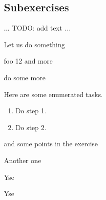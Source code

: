\documentclass[
  twocolumn,%
  fontsize=9pt,%
  DIV=calc,%
  numbers=noendperiod%
]{scrartcl}
\begin{document}
\subsection{Subexercises}
... TODO: add text ...

\begin{exercise}
  Let us do something
  \begin{subexercise}
    foo 12 
    and more 
  \end{subexercise}

  \begin{subexercise}
    do some more
  \end{subexercise}

  \begin{subexercise}
    Here are some enumerated tasks.
    \begin{enumerate}
      \item Do step 1.
      \item Do step 2. 
    \end{enumerate}
  \end{subexercise}

  and some points in the exercise 
\end{exercise}

\begin{exercise}
  Another one
  \begin{subexercise}
    Yse 
  \end{subexercise}
  \begin{subexercise}
    Yse 
  \end{subexercise}
\end{exercise}
\end{document}
